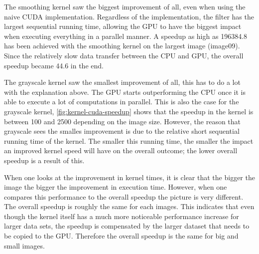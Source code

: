 \documentclass[final]{report}
\begin{document}
The smoothing kernel saw the biggest improvement of all, even when using the naive CUDA implementation.
Regardless of the implementation, the filter has the largest sequential running time, allowing the GPU to have the biggest impact when executing everything in a parallel manner.
A speedup as high as 196384.8 has been achieved with the smoothing kernel on the largest image (image09).
Since the relatively slow data transfer between the CPU and GPU, the overall speedup became 44.6 in the end.

The grayscale kernel saw the smallest improvement of all, this has to do a lot with the explanation above.
The GPU starts outperforming the CPU once it is able to execute a lot of computations in parallel.
This is also the case for the grayscale kernel, \cref{fig:kernel-cuda-speedup} shows that the speedup in the kernel is between 100 and 2500 depending on the image size.
However, the reason that grayscale sees the smalles improvement is due to the relative short sequential running time of the kernel.
The smaller this running time, the smaller the impact an improved kernel speed will have on the overall outcome; the lower overall speedup is a result of this.

When one looks at the improvement in kernel times, it is clear that the bigger the image the bigger the improvement in execution time.
However, when one compares this performance to the overall speedup the picture is very different.
The overall speedup is roughly the same for each images.
This indicates that even though the kernel itself has a much more noticeable performance increase for larger data sets, the speedup is compensated by the larger dataset that needs to be copied to the GPU.
Therefore the overall speedup is the same for big and small images.
\end{document}
